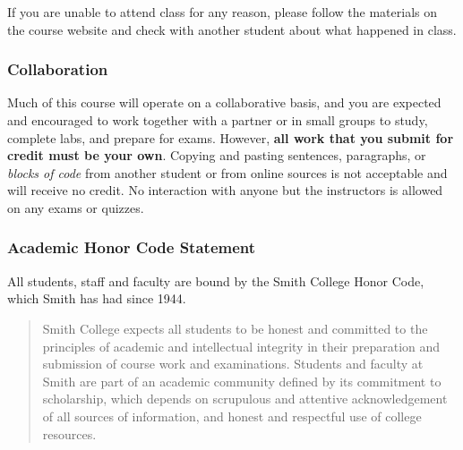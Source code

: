 \documentclass[
  letterpaper,
  DIV=11,
  numbers=noendperiod]{scrartcl}
\begin{document}
If you are unable to attend class for any reason, please follow the
materials on the course website and check with another student about
what happened in class.

\hypertarget{collaboration}{%
\subsubsection{Collaboration}\label{collaboration}}

\begin{tcolorbox}[enhanced jigsaw, toptitle=1mm, toprule=.15mm, colframe=quarto-callout-warning-color-frame, colback=white, breakable, opacityback=0, opacitybacktitle=0.6, coltitle=black, rightrule=.15mm, bottomrule=.15mm, titlerule=0mm, leftrule=.75mm, colbacktitle=quarto-callout-warning-color!10!white, title=\textcolor{quarto-callout-warning-color}{\faExclamationTriangle}\hspace{0.5em}{Warning}, left=2mm, arc=.35mm, bottomtitle=1mm]

Much of this course will operate on a collaborative basis, and you are
expected and encouraged to work together with a partner or in small
groups to study, complete labs, and prepare for exams. However,
\textbf{all work that you submit for credit must be your own}. Copying
and pasting sentences, paragraphs, or \emph{blocks of code} from another
student or from online sources is not acceptable and will receive no
credit. No interaction with anyone but the instructors is allowed on any
exams or quizzes.

\end{tcolorbox}

\hypertarget{academic-honor-code-statement}{%
\subsubsection{Academic Honor Code
Statement}\label{academic-honor-code-statement}}

All students, staff and faculty are bound by the Smith College Honor
Code, which Smith has had since 1944.

\begin{quote}
Smith College expects all students to be honest and committed to the
principles of academic and intellectual integrity in their preparation
and submission of course work and examinations. Students and faculty at
Smith are part of an academic community defined by its commitment to
scholarship, which depends on scrupulous and attentive acknowledgement
of all sources of information, and honest and respectful use of college
resources.
\end{quote}
\end{document}
